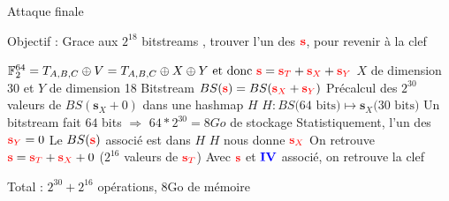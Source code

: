 \begin{frame}{Attaque finale}

\begin{outline}
    \1 Objectif : Grace aux $2^{18}$ bitstreams , trouver l'un des $\textcolor{red}{\mathbf{s}}$, pour revenir à la clef
    
    \pause
    
    \1 $\mathbb{F}_2^{64} = T_{A,B,C}\oplus V = T_{A,B,C} \oplus  X \oplus  Y \text{ et donc } \textcolor{red}{\mathbf{s}} = \textcolor{red}{\mathbf{s}_{T}}+\textcolor{red}{\mathbf{s}_{X}}+\textcolor{red}{\mathbf{s}_Y}$
    \2 $X$ de dimension 30 et $Y$ de dimension 18
    \pause
    \2 Bitstream $BS(\textcolor{red}{\mathbf{s}}) = BS(\textcolor{red}{\mathbf{s}_{X}}+\textcolor{red}{\mathbf{s}_Y})$
\pause
\1 Précalcul des $2^{30}$ valeurs de $BS(\mathbf{s}_{X}+0)$ dans une hashmap $H$
\pause
    \2 $H : BS \text{(64 bits)} \mapsto \mathbf{s}_{X} \text{(30 bits)}$
    \pause
    \2 Un bitstream fait $64$ bits $\Rightarrow$ $64*2^{30}=8Go$ de stockage
    \pause
\1 Statistiquement, l'un des $\textcolor{red}{\mathbf{s}_Y}=0$
\pause
    \2 Le $BS(\textcolor{red}{\mathbf{s}})$ associé est dans $H$
    \pause
    \2 $H$ nous donne $\textcolor{red}{\mathbf{s}_{X}}$ 
    \pause
\1 On retrouve $\textcolor{red}{\mathbf{s}} = \textcolor{red}{\mathbf{s}_{T}}+\textcolor{red}{\mathbf{s}_{X}}+0$ ($2^{16}$ valeurs de $\textcolor{red}{\mathbf{s}_{T}}$)
\1 Avec $\textcolor{red}{\mathbf{s}}$ et $\textcolor{blue}{\mathbf{IV}}$ associé, on retrouve la clef

\1 Total : $2^{30} + 2^{16}$ opérations, 8Go de mémoire  \hfill \flag
\end{outline}

\end{frame}

